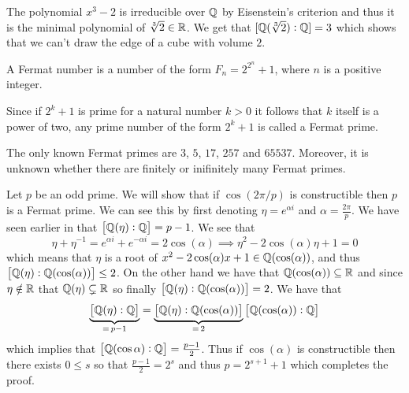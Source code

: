 \documentclass[11pt,a4paper]{article}
\begin{document}
\begin{example}
  The polynomial $x^3 - 2$ is irreducible over $\mathbb{Q}$ by Eisenstein's
  criterion and thus it is the minimal polynomial of $\sqrt[3]{2} \in \mathbb{R}$.
  We get that $[\mathbb{Q}(\sqrt[3]{2}) : \mathbb{Q}] = 3$
  which shows that we can't draw the edge of a cube with volume $2$.
\end{example}

\begin{definition}
  A Fermat number is a number of the form $F_{n}=2^{2^{n}}+1$,
  where $n$ is a positive integer.
\end{definition}

\begin{definition}
  Since if $2^k + 1$ is prime for a natural number $k > 0$
  it follows that $k$ itself is a power of two,
  any prime number of the form $2^k + 1$ is called a Fermat prime.
\end{definition}
\begin{remark}
  The only known Fermat primes are $3$, $5$, $17$, $257$ and $65537$.
  Moreover, it is unknown whether there are finitely or inifinitely many
  Fermat primes.
\end{remark}

\begin{example}
  \label{exmp:when-pgon-construcible-p-is-fermat}
  Let $p$ be an odd prime.
  We will show that if $\cos(2\pi/p)$ is constructible then $p$
  is a Fermat prime.
  We can see this by first denoting $\eta = e^{\alpha i}$
  and $\alpha = \frac{2\pi}{p}$.
  We have seen earlier in 
  that $\left[\mathbb{Q}(\eta) : \mathbb{Q}\right] = p - 1$.
  We see that
  \[
    \eta + \eta^{-1} =
    e^{\alpha i} + e^{-\alpha i} =
    2 \cos(\alpha) \implies
    \eta^2 - 2\cos(\alpha) \eta + 1 = 0
  \]
  which means that $\eta$ is a root of
  $x^2 - 2\cos(\alpha)x + 1 \in \mathbb{Q}(\cos(\alpha))$,
  and thus $\left[\mathbb{Q}(\eta) : \mathbb{Q}(\cos(\alpha))\right] \le 2$.
  On the other hand we have that $\mathbb{Q}(\cos(\alpha)) \subseteq \mathbb{R}$
  and since $\eta \notin \mathbb{R}$ that $\mathbb{Q}(\eta) \subsetneq \mathbb{R}$ so
  finally $\left[\mathbb{Q}(\eta) : \mathbb{Q}(\cos(\alpha))\right] = 2$.
  We have that
  \[
    \underbrace{\left[\mathbb{Q}(\eta) : \mathbb{Q}\right]}_{=\,p-1} =
    \underbrace{\left[\mathbb{Q}(\eta) : \mathbb{Q}(\cos(\alpha))\right]}_{=\,2}
    \left[\mathbb{Q}(\cos(\alpha)) : \mathbb{Q}\right]
  \]
  which implies that $\left[\mathbb{Q}(\cos \alpha) : \mathbb{Q}\right] = \frac{p-1}{2}$.
  Thus if $\cos(\alpha)$ is constructible then there exists $0 \le s$
  so that $\frac{p-1}{2} = 2^s$
  and thus $p = 2^{s+1} + 1$ which completes the proof.
\end{example}
\end{document}
